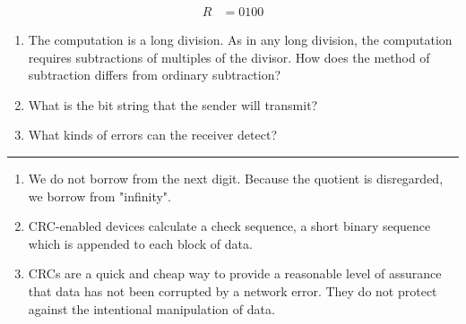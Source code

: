 \documentclass[twoside]{article}
\newenvironment{answer}
  {\vspace*{0.2cm} \rule{12cm}{0.04cm} \vspace*{0.2cm}}
  {\vspace*{0.2cm}}
\begin{document}
\begin{enumerate}
  \begin{align*}
    R & = 0100
    \end{align*}

  \begin{enumerate}
    \item The computation is a long division. As in any long division, the computation
      requires subtractions of multiples of the divisor. How does the method of subtraction
      differs from ordinary subtraction? 
    \item What is the bit string that the sender will transmit?
    \item What kinds of errors can the receiver detect?
    \end{enumerate}

  \begin{answer}

  \begin{enumerate}
    \item We do not borrow from the next digit.  Because the quotient is disregarded, we borrow from "infinity".
    \item CRC-enabled devices calculate a check sequence, a short binary sequence which is appended to each block of data.
    \item CRCs are a quick and cheap way to provide a reasonable level of assurance that data has not been corrupted by a network error.  They do not protect against the intentional manipulation of data.
    \end{enumerate}

    \end{answer}

  \end{enumerate}
\end{document}
